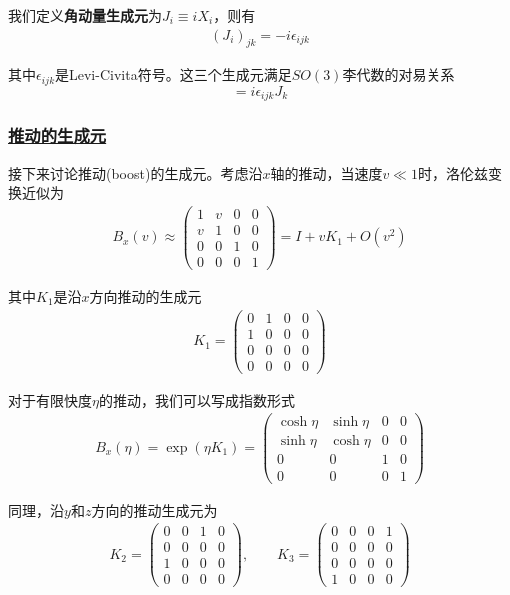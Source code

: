 我们定义\textbf{角动量生成元}为$J_i \equiv iX_i$，则有
\begin{align*}
    (J_i)_{jk} = -i\epsilon_{ijk}
\end{align*}

其中$\epsilon_{ijk}$是Levi-Civita符号。这三个生成元满足$SO(3)$李代数的对易关系
\begin{equation*}
    [J_i, J_j] = i\epsilon_{ijk}J_k
\end{equation*}

\subsubsection{\protect\hyperlink{:}{推动的生成元}}

接下来讨论推动(boost)的生成元。考虑沿$x$轴的推动，当速度$v \ll 1$时，洛伦兹变换近似为
\begin{align*}
    B_x(v) \approx
    \begin{pmatrix}
        1&v&0&0\\
        v&1&0&0\\
        0&0&1&0\\
        0&0&0&1   
    \end{pmatrix}
    = I + vK_1 + O(v^2)
\end{align*}

其中$K_1$是沿$x$方向推动的生成元
\begin{align*}
    K_1 =
    \begin{pmatrix}
        0&1&0&0\\
        1&0&0&0\\
        0&0&0&0\\
        0&0&0&0
    \end{pmatrix}
\end{align*}

对于有限快度$\eta$的推动，我们可以写成指数形式
\begin{align*}
    B_x(\eta) = \exp(\eta K_1) =
    \begin{pmatrix}
        \cosh\eta&\sinh\eta&0&0\\
        \sinh\eta&\cosh\eta&0&0\\
        0&0&1&0\\
        0&0&0&1
    \end{pmatrix}
\end{align*}

同理，沿$y$和$z$方向的推动生成元为
\begin{align*}
    K_2 =
    \begin{pmatrix}
        0&0&1&0\\
        0&0&0&0\\
        1&0&0&0\\
        0&0&0&0
    \end{pmatrix}, \qquad
    K_3 =
    \begin{pmatrix}
        0&0&0&1\\
        0&0&0&0\\
        0&0&0&0\\
        1&0&0&0
    \end{pmatrix}
\end{align*}

